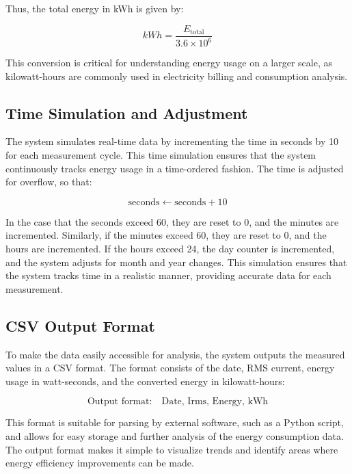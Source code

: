 Thus, the total energy in kWh is given by:

\[
kWh = \frac{E_{\text{total}}}{3.6 \times 10^6}
\]

This conversion is critical for understanding energy usage on a larger scale, as kilowatt-hours are commonly used in electricity billing and consumption analysis.

\subsection{Time Simulation and Adjustment}

The system simulates real-time data by incrementing the time in seconds by 10 for each measurement cycle. This time simulation ensures that the system continuously tracks energy usage in a time-ordered fashion. The time is adjusted for overflow, so that:

\[
\text{seconds} \leftarrow \text{seconds} + 10
\]

In the case that the seconds exceed 60, they are reset to 0, and the minutes are incremented. Similarly, if the minutes exceed 60, they are reset to 0, and the hours are incremented. If the hours exceed 24, the day counter is incremented, and the system adjusts for month and year changes. This simulation ensures that the system tracks time in a realistic manner, providing accurate data for each measurement.

\subsection{CSV Output Format}

To make the data easily accessible for analysis, the system outputs the measured values in a CSV format. The format consists of the date, RMS current, energy usage in watt-seconds, and the converted energy in kilowatt-hours:

\[
\text{Output format:} \quad \text{Date, Irms, Energy, kWh}
\]

This format is suitable for parsing by external software, such as a Python script, and allows for easy storage and further analysis of the energy consumption data. The output format makes it simple to visualize trends and identify areas where energy efficiency improvements can be made.
